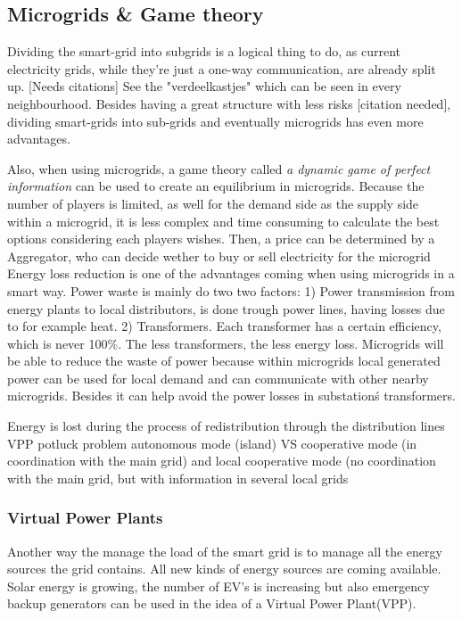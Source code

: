 \subsection{Microgrids \& Game theory}
Dividing the smart-grid into subgrids is a logical thing to do, as current electricity grids, while they're just a one-way communication, are already split up. [Needs citations] See the "verdeelkastjes" which can be seen in every neighbourhood. Besides having a great structure with less risks [citation needed], dividing smart-grids into sub-grids and eventually microgrids  has even more advantages. 

Also, when using microgrids, a game theory called \emph{a dynamic game of perfect information}  can be used to create an equilibrium in microgrids. Because the number of players is limited, as well for the demand side as the supply side within a microgrid, it is less complex and time consuming to calculate the best options considering each players wishes. Then, a price can be determined by a Aggregator, who can decide wether to buy or sell electricity for the microgrid \cite{MicrogridModellingPetrosAristidou}
Energy loss reduction is one of the advantages coming when using microgrids in a smart way. Power waste is mainly do two two factors\cite{EnergyLossURL}: 1) Power transmission from energy plants to local distributors, is done trough power lines, having losses due to for example heat. 2) Transformers. Each transformer has a certain efficiency, which is never 100\%. The less transformers, the less energy loss.
Microgrids will be able to reduce the waste of power because within microgrids local generated power can be used for local demand and can communicate with other nearby microgrids. Besides it can help avoid the power losses in substation\'s transformers\cite{keypaper}.

Energy is lost during the process of redistribution through the distribution lines
VPP
potluck problem
autonomous mode (island) VS cooperative mode (in coordination with the main grid) and local cooperative mode (no coordination with the main grid, but with information in several local grids

\subsubsection{Virtual Power Plants}
Another way the manage the load of the smart grid is to manage all the energy sources the grid contains. All new kinds of energy sources are coming available. Solar energy is growing, the number of EV's is increasing but also emergency backup generators can be used in the idea of a Virtual Power Plant(VPP). 

